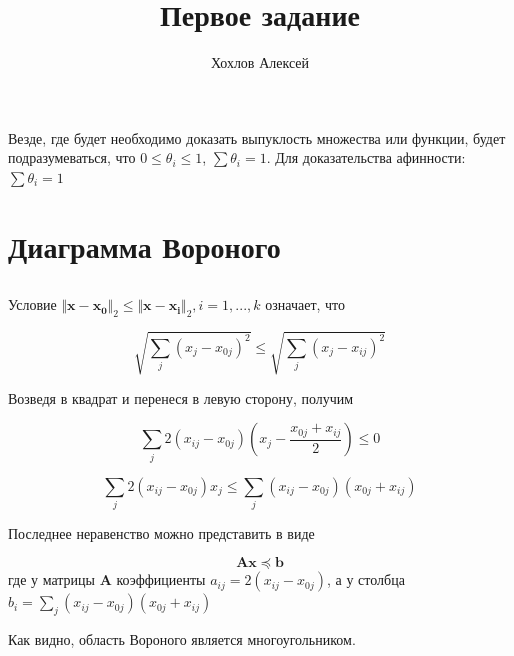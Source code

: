 
\title{Первое задание}
\author{
	Хохлов Алексей \\
}


	\maketitle
	
	Везде, где будет необходимо доказать выпуклость множества или функции, будет
	подразумеваться, что $0 \leqslant \theta_i \leqslant 1$, $\sum \theta_i = 1$.
	Для доказательства афинности:$\sum \theta_i = 1$
	
	\section{Диаграмма Вороного}
	
	\subsection{}
	
	Условие $\Vert \mathbf{x} - \mathbf{x_0} \Vert_2 \leqslant \Vert \mathbf{x} -
	\mathbf{x_i} \Vert_2 , i=1,...,k$ означает, что
	
	\begin{equation}
	\sqrt {\sum_j (x_j-x_{0j})^2 }\leqslant \sqrt {\sum_j (x_j-x_{ij})^2 }
	\end{equation}
	
	Возведя в квадрат и перенеся в левую сторону, получим
	
	\begin{equation}
	\sum_j 2(x_{ij}-x_{0j})(x_j - \frac{x_{0j}+x_{ij}}{2}) \leqslant 0
	\end{equation}
	
	\begin{equation}
	\label{13}
	\sum_j 2(x_{ij}-x_{0j})x_j \leqslant  	\sum_j (x_{ij}-x_{0j}) (x_{0j}+x_{ij}) 
	\end{equation}
	
	Последнее неравенство можно представить в виде
	
	\begin{equation}
	\mathbf{A} \mathbf{x} \preceq \mathbf{b}
	\end{equation}
	где у матрицы $\mathbf{A}$ коэффициенты $ a_{ij} = 2(x_{ij}-x_{0j})$, а у
	столбца $ b_i = \sum\limits_{j} (x_{ij}-x_{0j}) (x_{0j}+x_{ij}) $
	
	Как видно, область Вороного является многоугольником.
	
	\subsection{}
	
